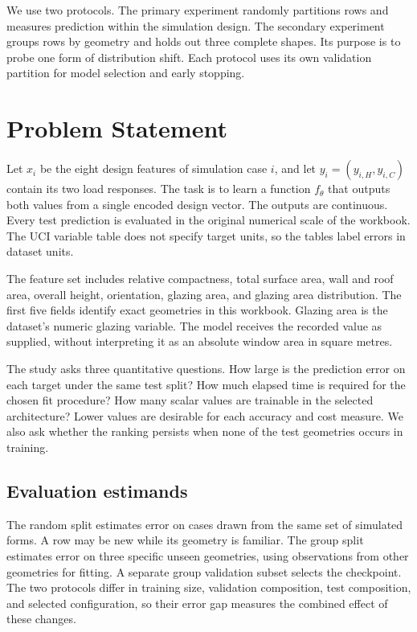 \documentclass[11pt,twocolumn,letterpaper]{article}
\begin{document}
We use two protocols. The primary experiment randomly partitions rows and measures prediction within the simulation design. The secondary experiment groups rows by geometry and holds out three complete shapes. Its purpose is to probe one form of distribution shift. Each protocol uses its own validation partition for model selection and early stopping.

\section{Problem Statement}
Let \(x_i\) be the eight design features of simulation case \(i\), and let \(y_i=(y_{i,H},y_{i,C})\) contain its two load responses. The task is to learn a function \(f_\theta\) that outputs both values from a single encoded design vector. The outputs are continuous. Every test prediction is evaluated in the original numerical scale of the workbook. The UCI variable table does not specify target units, so the tables label errors in dataset units.

The feature set includes relative compactness, total surface area, wall and roof area, overall height, orientation, glazing area, and glazing area distribution. The first five fields identify exact geometries in this workbook. Glazing area is the dataset's numeric glazing variable. The model receives the recorded value as supplied, without interpreting it as an absolute window area in square metres.

The study asks three quantitative questions. How large is the prediction error on each target under the same test split? How much elapsed time is required for the chosen fit procedure? How many scalar values are trainable in the selected architecture? Lower values are desirable for each accuracy and cost measure. We also ask whether the ranking persists when none of the test geometries occurs in training.

\subsection{Evaluation estimands}
The random split estimates error on cases drawn from the same set of simulated forms. A row may be new while its geometry is familiar. The group split estimates error on three specific unseen geometries, using observations from other geometries for fitting. A separate group validation subset selects the checkpoint. The two protocols differ in training size, validation composition, test composition, and selected configuration, so their error gap measures the combined effect of these changes.
\end{document}
